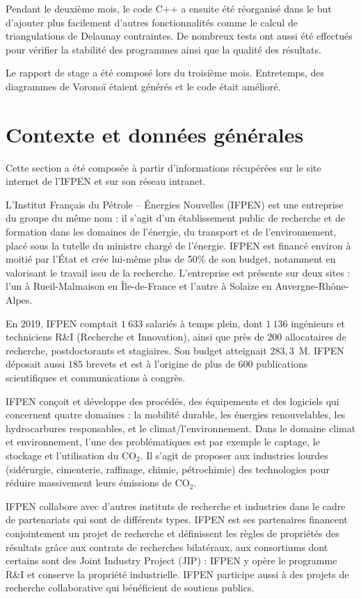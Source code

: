 \documentclass[12pt,a4paper]{report}
\begin{document}
Pendant le deuxième mois, le code C++ a ensuite été réorganisé dans le but d'ajouter plus facilement d'autres fonctionnalités comme le calcul de triangulations de Delaunay contraintes. De nombreux tests ont aussi été effectués pour vérifier la stabilité des programmes ainsi que la qualité des résultats.

Le rapport de stage a été composé lors du troisième mois. Entretemps, des diagrammes de Voronoï étaient générés et le code était amélioré.

\newpage
\section{Contexte et données générales}
Cette section a été composée à partir d'informations récupérées sur le site internet de l'IFPEN et sur son réseau intranet.

L'Institut Français du Pétrole -- \'Energies Nouvelles (IFPEN) est une entreprise du groupe du même nom : il s'agit d'un établissement public de recherche et de formation dans les domaines de l'énergie, du transport et de l'environnement, placé sous la tutelle du ministre chargé de l'énergie. IFPEN est financé environ à moitié par l'\'Etat et crée lui-même plus de 50\% de son budget, notamment en valorisant le travail issu de la recherche. L'entreprise est présente sur deux sites : l'un à Rueil-Malmaison en \^Ile-de-France et l'autre à Solaize en Auvergne-Rhône-Alpes.

En 2019, IFPEN comptait $1\ 633$ salariés à temps plein, dont $1\ 136$ ingénieurs et techniciens R\&I (Recherche et Innovation), ainsi que près de $200$ allocataires de recherche, postdoctorants et stagiaires. Son budget atteignait $283,3$~\textrm{M}\texteuro. IFPEN déposait aussi $185$ brevets et est à l'origine de plus de $600$ publications scientifiques et communications à congrès.

IFPEN conçoit et développe des procédés, des équipements et des logiciels qui concernent quatre domaines : la mobilité durable, les énergies renouvelables, les hydrocarbures responsables, et le climat/l'environnement. Dans le domaine climat et environnement, l'une des problématiques est par exemple le captage, le stockage et l'utilisation du CO$_2$. Il s'agit de proposer aux industries lourdes (sidérurgie, cimenterie, raffinage, chimie, pétrochimie) des technologies pour réduire massivement leurs émissions de CO$_2$.

IFPEN collabore avec d'autres instituts de recherche et industries dans le cadre de partenariats qui sont de différents types. IFPEN est ses partenaires financent conjointement un projet de recherche et définissent les règles de propriétés des résultats grâce aux contrats de recherches bilatéraux, aux consortiums dont certains sont des Joint Industry Project (JIP) : IFPEN y opère le programme R\&I et conserve la propriété industrielle. IFPEN participe aussi à des projets de recherche collaborative qui bénéficient de soutiens publics.
\end{document}
